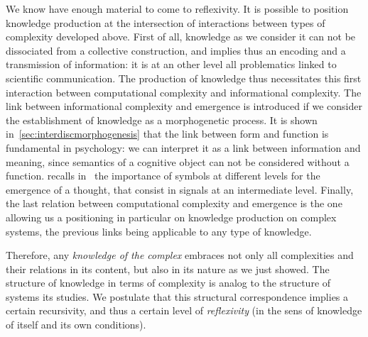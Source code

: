We know have enough material to come to reflexivity. It is possible to position knowledge production at the intersection of interactions between types of complexity developed above. First of all, knowledge as we consider it can not be dissociated from a collective construction, and implies thus an encoding and a transmission of information: it is at an other level all problematics linked to scientific communication. The production of knowledge thus necessitates this first interaction between computational complexity and informational complexity. The link between informational complexity and emergence is introduced if we consider the establishment of knowledge as a morphogenetic process. It is shown in~\ref{sec:interdiscmorphogenesis} that the link between form and function is fundamental in psychology: we can interpret it as a link between information and meaning, since semantics of a cognitive object can not be considered without a function.  recalls in~\cite{hofstadter1980godel} the importance of symbols at different levels for the emergence of a thought, that consist in signals at an intermediate level. Finally, the last relation between computational complexity and emergence is the one allowing us a positioning in particular on knowledge production on complex systems, the previous links being applicable to any type of knowledge.

Therefore, any \emph{knowledge of the complex} embraces not only all complexities and their relations in its content, but also in its nature as we just showed. The structure of knowledge in terms of complexity is analog to the structure of systems its studies. We postulate that this structural correspondence implies a certain recursivity, and thus a certain level of \emph{reflexivity} (in the sens of knowledge of itself and its own conditions).


